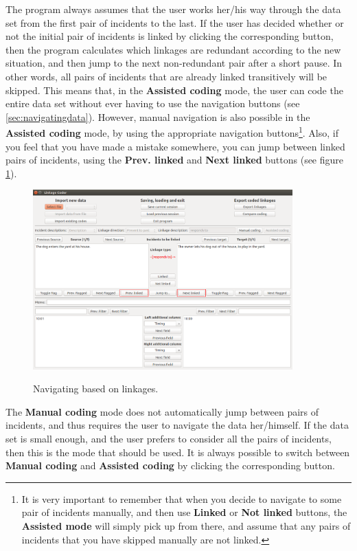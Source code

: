 \documentclass{memoir}
\begin{document}
The program always assumes that the user works her/his way through the data set from the first pair of incidents to the last. If the user has decided whether or not the initial pair of incidents is linked by clicking the corresponding button, then the program calculates which linkages are redundant according to the new situation, and then jump to the next non-redundant pair after a short pause. In other words, all pairs of incidents that are already linked transitively will be skipped. This means that, in the \textbf{Assisted coding} mode, the user can code the entire data set without ever having to use the navigation buttons (see \ref{sec:navigatingdata}). However, manual navigation is also possible in the \textbf{Assisted coding} mode, by using the appropriate navigation buttons\footnote{It is very important to remember that when you decide to navigate to some pair of incidents manually, and then use \textbf{Linked} or \textbf{Not linked} buttons, the \textbf{Assisted mode} will simply pick up from there, and assume that any pairs of incidents that you have skipped manually are not linked.}. Also, if you feel that you have made a mistake somewhere, you can jump between linked pairs of incidents, using the \textbf{Prev. linked} and \textbf{Next linked} buttons (see figure \ref{fig:linkedbuttons}).

\begin{figure}[h!]
  \centering
  \caption{Navigating based on linkages.}
  \includegraphics[width=100mm]{Screenshot_21.pdf}
  \label{fig:linkedbuttons}
\end{figure}

The \textbf{Manual coding} mode does not automatically jump between pairs of incidents, and thus requires the user to navigate the data her/himself. If the data set is small enough, and the user prefers to consider all the pairs of incidents, then this is the mode that should be used. It is always possible to switch between \textbf{Manual coding} and \textbf{Assisted coding} by clicking the corresponding button.
\end{document}
